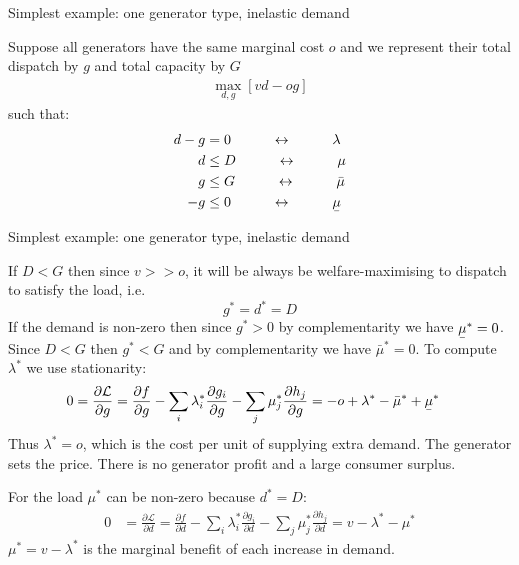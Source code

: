 \documentclass[10pt,aspectratio=169,dvipsnames]{beamer}
\def\l{\lambda}
\def\m{\mu}
\def\d{\partial}
\def\cL{\mathcal{L}}
\newcommand{\ubar}[1]{\text{\b{$#1$}}}
\begin{document}
\begin{frame}{Simplest example: one generator type, inelastic demand}

  Suppose all generators have the same marginal cost $o$ and we
  represent their total dispatch by $g$ and total capacity by $G$
  \begin{align*}
    \max_{d, g }\left[ vd  -  og\right]
  \end{align*}
  such that:
  \begin{align*}
    d - g & = 0  \hspace{1cm}\leftrightarrow\hspace{1cm} \l \\
    d & \leq D  \hspace{1cm} \leftrightarrow \hspace{1cm} \m \\
    g  & \leq  G  \hspace{1cm}\leftrightarrow\hspace{1cm} \bar{\m} \\
    - g  & \leq  0  \hspace{1cm}\leftrightarrow\hspace{1cm} \ubar{\m}
  \end{align*}

\end{frame}


\begin{frame}{Simplest example: one generator type, inelastic demand}

  If $D < G$ then since $v >> o$, it will be always be welfare-maximising to dispatch to satisfy the load, i.e.
  \begin{equation*}
    g^* = d^* = D
  \end{equation*}
  If the demand is non-zero then since $g^* > 0$ by complementarity we
  have $\ubar{\m}^* = 0$. Since $D < G$ then $g^* < G$ and
  by complementarity we have $\bar{\m}^* = 0$. To compute $\l^*$ we use stationarity:
  \begin{align*}
    0 & = \frac{\d \cL}{\d g } =   \frac{\d f}{\d g} - \sum_i \l_i^* \frac{\d g_i}{\d g}  - \sum_j \m_j^* \frac{\d h_j}{\d g} = - o + \l^* - \bar{\m}^* + \ubar{\m}^*
  \end{align*}
  Thus $\l^* = o$, which is the cost per unit of supplying extra demand. The \alert{generator sets the price}. There is no generator profit and a large consumer surplus.

  For the load $\m^*$ can be non-zero because $d^*=D$:
    \begin{align*}
      0 & = \frac{\d \cL}{\d d} =   \frac{\d f}{\d d} - \sum_i \l_i^* \frac{\d g_i}{\d d}  - \sum_j \m_j^* \frac{\d h_j}{\d d} = v - \l^* - \m^*
    \end{align*}
    $\m^* = v - \l^*$ is the marginal benefit of each increase in demand.
\end{frame}
\end{document}
